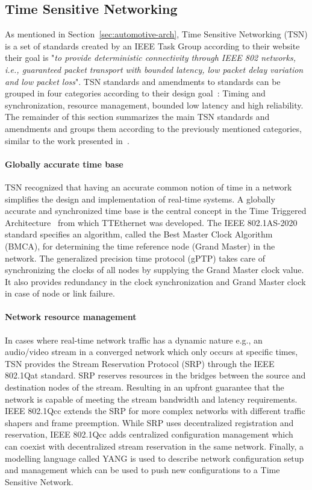 \subsection{Time Sensitive Networking}
\label{sec:tsn}
As mentioned in Section~\ref{sec:automotive-arch}, Time Sensitive Networking (TSN) is a set of standards created by an IEEE Task Group according to their website their goal is "\textit{to provide deterministic connectivity through IEEE 802 networks, i.e., guaranteed packet transport with bounded latency, low packet delay variation and low packet loss}". TSN standards and amendments to standards can be grouped in four categories according to their design goal~\cite{ashjaei2021time}: Timing and synchronization, resource management, bounded low latency and high reliability. The remainder of this section summarizes the main TSN standards and amendments and groups them according to the previously mentioned categories, similar to the work presented in~\cite{ashjaei2021time}.

\paragraph{Globally accurate time base}
TSN recognized that having an accurate common notion of time in a network simplifies the design and implementation of real-time systems. A globally accurate and synchronized time base is the central concept in the Time Triggered Architecture~\cite{kopetz2003time} from which TTEthernet was developed. The IEEE 802.1AS-2020 standard specifies an algorithm, called the Best Master Clock Algorithm (BMCA), for determining the time reference node (Grand Master) in the network. The generalized precision time protocol (gPTP) takes care of synchronizing the clocks of all nodes by supplying the Grand Master clock value. It also provides redundancy in the clock synchronization and Grand Master clock in case of node or link failure.

\paragraph{Network resource management} In cases where real-time network traffic has a dynamic nature e.g., an audio/video stream in a converged network which only occurs at specific times, TSN provides the Stream Reservation Protocol (SRP) through the IEEE 802.1Qat standard. SRP reserves resources in the bridges between the source and destination nodes of the stream. Resulting in an upfront guarantee that the network is capable of meeting the stream bandwidth and latency requirements. IEEE 802.1Qcc extends the SRP for more complex networks with different traffic shapers and frame preemption. While SRP uses decentralized registration and reservation, IEEE 802.1Qcc adds centralized configuration management which can coexist with decentralized stream reservation in the same network. Finally, a modelling language called YANG is used to describe network configuration setup and management which can be used to push new configurations to a Time Sensitive Network. 

